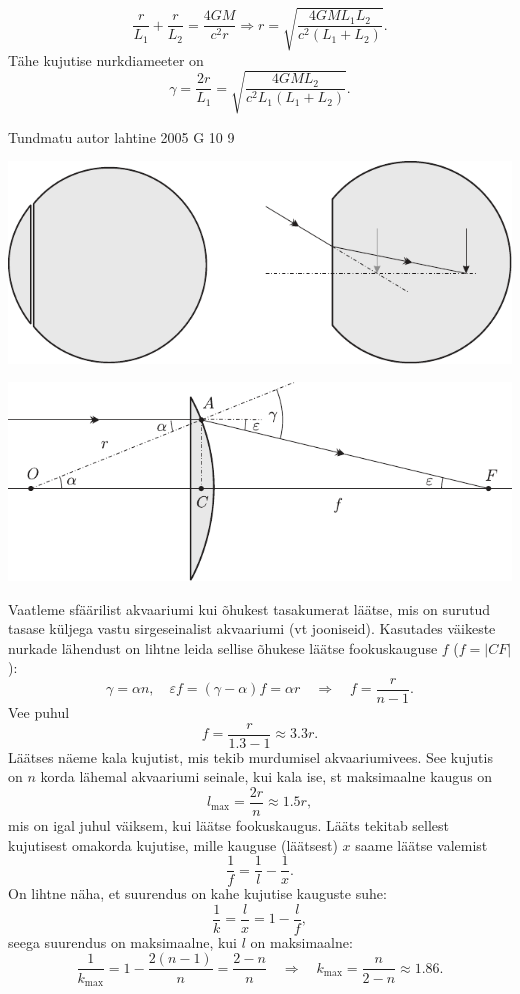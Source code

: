 \documentclass[11pt]{article}
\begin{document}
{{\[
\frac{r}{L_{1}}+\frac{r}{L_{2}}=\frac{4 G M}{c^{2} r} \Rightarrow r=\sqrt{\frac{4 G M L_{1} L_{2}}{c^{2}\left(L_{1}+L_{2}\right)}}.
\]
Tähe kujutise nurkdiameeter on
\[
\gamma=\frac{2 r}{L_{1}}=\sqrt{\frac{4 G M L_{2}}{c^{2} L_{1}\left(L_{1}+L_{2}\right)}}.
\]
\fi
}

{Tundmatu autor} %
{lahtine} %
{2005} %
{G 10} %
{9} %
{

\ifSolution
\begin{center}
	\includegraphics[width=\linewidth]{2005-lahg-10-lah1}
\end{center}

\begin{center}
	\includegraphics[width=\linewidth]{2005-lahg-10-lah2}
\end{center}

Vaatleme sfäärilist akvaariumi kui õhukest tasakumerat läätse, mis on surutud tasase küljega vastu sirgeseinalist akvaariumi (vt jooniseid). Kasutades väikeste nurkade lähendust on lihtne leida sellise õhukese läätse fookuskauguse $f$ ($f = |CF|$):
\[
\gamma=\alpha n, \quad \varepsilon f=(\gamma-\alpha) f=\alpha r \quad \Rightarrow \quad f=\frac{r}{n-1}.
\]
Vee puhul
\[
f=\frac{r}{\num{1,3}-\num{1}} \approx \num{3,3} r.
\]
Läätses näeme kala kujutist, mis tekib murdumisel akvaariumivees. See kujutis on $n$ korda lähemal akvaariumi seinale, kui kala ise, st maksimaalne kaugus on
\[
l_{\max }=\frac{2 r}{n} \approx \num{1,5} r,
\]
mis on igal juhul väiksem, kui läätse fookuskaugus. Lääts tekitab sellest kujutisest omakorda kujutise, mille kauguse (läätsest) $x$ saame läätse valemist
\[
\frac{1}{f}=\frac{1}{l}-\frac{1}{x}.
\]
On lihtne näha, et suurendus on kahe kujutise kauguste suhe:
\[
\frac{1}{k}=\frac{l}{x}=1-\frac{l}{f},
\]
seega suurendus on maksimaalne, kui $l$ on maksimaalne:
\[
\frac{1}{k_{\max }}=1-\frac{2(n-1)}{n}=\frac{2-n}{n} \quad\Rightarrow\quad k_{\max }=\frac{n}{2-n} \approx \num{1,86}.
\]
\fi
}

}
\end{document}
